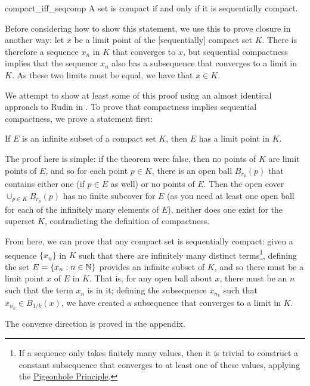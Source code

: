 \begin{btheorem}{}{compact_iff_seqcomp}
A set is compact if and only if it is sequentially compact.
\end{btheorem}

Before considering how to show this statement, we use this to prove closure in another way: let $x$ be a limit point of the [sequentially] compact set $K$. There is therefore a sequence $x_{n}$ in $K$ that converges to $x$, but sequential compactness implies that the sequence $x_{n}$ also has a subsequence that converges to a limit in $K$. As these two limits must be equal, we have that $x \in K$. 

We attempt to show at least some of this proof using an almost identical approach to Rudin in \cite{rudin}. To prove that compactness implies sequential compactness, we prove a statement first:

\begin{btheorem}{}{}
If $E$ is an infinite subset of a compact set $K$, then $E$ has a limit point in $K$.
\end{btheorem}
\begin{bproof}{}{}
The proof here is simple: if the theorem were false, then no points of $K$ are limit points of $E$, and so for each point $p\in K$, there is an open ball $B_{r_{p}}(p)$ that contains either one (if $p\in E$ as well) or no points of $E$. Then the open cover $\cup_{p \in K} B_{r_{p}}(p)$ has no finite subcover for $E$ (as you need at least one open ball for each of the infinitely many elements of $E$), neither does one exist for the superset $K$, contradicting the definition of compactness. 
\eop
\end{bproof}

From here, we can prove that any compact set is sequentially compact: given a sequence $\{x_{n}\}$ in $K$ such that there are infinitely many distinct terms\footnote{If a sequence only takes finitely many values, then it is trivial to construct a constant subsequence that converges to at least one of these values, applying the \href{https://en.wikipedia.org/wiki/Pigeonhole_principle}{Pigeonhole Principle}.}, defining the set $E = \{ x_{n} : n \in \mathbb{N} \}$ provides an infinite subset of $K$, and so there must be a limit point $x$ of $E$ in $K$. That is, for any open ball about $x$, there must be an $n$ such that the term $x_{n}$ is in it; defining the subsequence $x_{n_{k}}$ such that $x_{n_{k}} \in B_{1/k}(x)$, we have created a subsequence that converges to a limit in $K$.

The converse direction is proved in the appendix.

